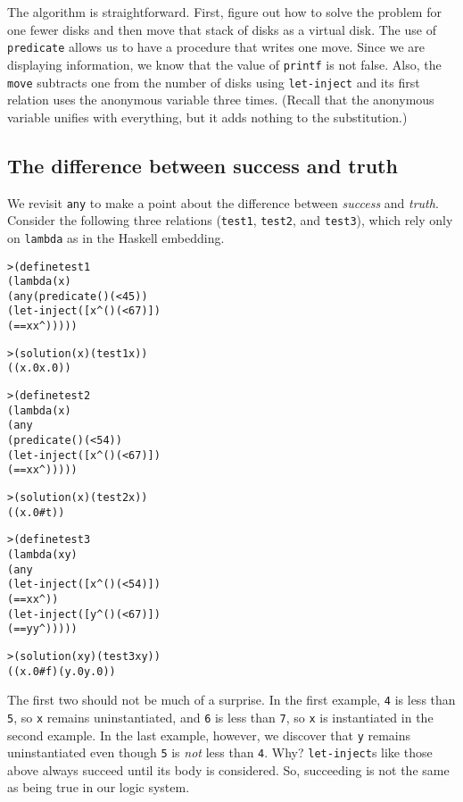 The algorithm is straightforward. First, figure out how to solve the
problem for one fewer disks and then move that stack of disks as a
virtual disk.  The use of \texttt{predicate} allows us to have a
procedure that writes one move.  Since we are displaying information,
we know that the value of \texttt{printf} is not false.  Also, the
\texttt{move} subtracts one from the number of disks using
\texttt{let-inject} and its first relation uses the anonymous variable
three times.  (Recall that the anonymous variable unifies with
everything, but it adds nothing to the substitution.)

\subsection{The difference between success and truth}

We revisit \texttt{any} to make a point about the difference between
\emph{success} and \emph{truth}.  Consider the following three
relations (\texttt{test1}, \texttt{test2}, and \texttt{test3}), which
rely only on \texttt{lambda} as in the Haskell embedding.

\begin{alltt}
> (define test1
    (lambda (x)
      (any (predicate () (< 4 5))
        (let-inject ([x^ () (< 6 7)])
          (== x x^)))))

> (solution (x) (test1 x))
((x.0 x.0))
\end{alltt}
\begin{alltt}
> (define test2
    (lambda (x)
      (any
        (predicate () (< 5 4))
        (let-inject ([x^ () (< 6 7)])
          (== x x^)))))

> (solution (x) (test2 x))
((x.0 #t))
\end{alltt}
\begin{alltt}
> (define test3
    (lambda (x y)
      (any
        (let-inject ([x^ () (< 5 4)])
          (== x x^))
        (let-inject ([y^ () (< 6 7)])
          (== y y^)))))

> (solution (x y) (test3 x y))
((x.0 #f) (y.0 y.0))
\end{alltt}

The first two should not be much of a surprise.  In the first example,
\texttt{4} is less than \texttt{5}, so \texttt{x} remains
uninstantiated, and \texttt{6} is less than \texttt{7}, so \texttt{x}
is instantiated in the second example.  In the last example, however,
we discover that \texttt{y} remains uninstantiated even though
\texttt{5} is \emph{not} less than \texttt{4}.  Why?
\texttt{let-inject}s like those above always succeed until its body is
considered.  So, succeeding is not the same as being true in our logic
system.

